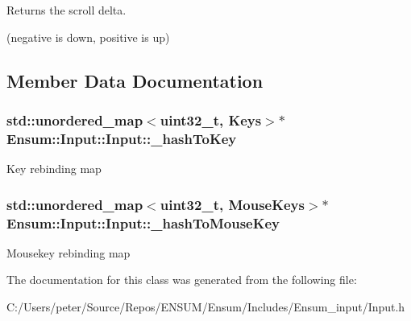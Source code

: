 Returns the scroll delta. 

(negative is down, positive is up) 

\subsection{Member Data Documentation}
\subsubsection[{\texorpdfstring{\+\_\+hash\+To\+Key}{_hashToKey}}]{\setlength{\rightskip}{0pt plus 5cm}std\+::unordered\+\_\+map$<$uint32\+\_\+t, Keys$>$$\ast$ Ensum\+::\+Input\+::\+Input\+::\+\_\+hash\+To\+Key\hspace{0.3cm}{\ttfamily [private]}}\hypertarget{class_ensum_1_1_input_1_1_input_af90c0c338bd019973b1d4428692fb231}{}\label{class_ensum_1_1_input_1_1_input_af90c0c338bd019973b1d4428692fb231}
Key rebinding map 
\subsubsection[{\texorpdfstring{\+\_\+hash\+To\+Mouse\+Key}{_hashToMouseKey}}]{\setlength{\rightskip}{0pt plus 5cm}std\+::unordered\+\_\+map$<$uint32\+\_\+t, Mouse\+Keys$>$$\ast$ Ensum\+::\+Input\+::\+Input\+::\+\_\+hash\+To\+Mouse\+Key\hspace{0.3cm}{\ttfamily [private]}}\hypertarget{class_ensum_1_1_input_1_1_input_af3920116a7bc186e9beb111e77b9f0f5}{}\label{class_ensum_1_1_input_1_1_input_af3920116a7bc186e9beb111e77b9f0f5}
Mousekey rebinding map 

The documentation for this class was generated from the following file\+:\begin{DoxyCompactItemize}
\item 
C\+:/\+Users/peter/\+Source/\+Repos/\+E\+N\+S\+U\+M/\+Ensum/\+Includes/\+Ensum\+\_\+input/Input.\+h\end{DoxyCompactItemize}
